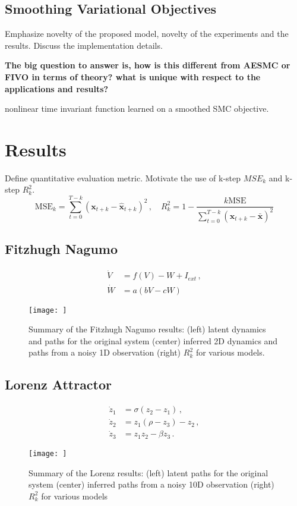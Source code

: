 \documentclass{article}
\newcommand{\be}{\begin{equation}}
\newcommand{\ee}{\end{equation}}
\newcommand{\trm}[1]{\textrm{#1}}
\newcommand{\mbf}[1]{\mathbf{#1}}
\newcommand{\bx}{\mbf{x}}
\newcommand{\nn}{\nonumber}
\begin{document}
\subsection{Smoothing Variational Objectives}
Emphasize novelty of the proposed model, novelty of the experiments and the results. Discuss the implementation details. 

\textbf{The big question to answer is, how is this different from AESMC or FIVO in terms of theory? what is unique with respect to the applications and results?} 

nonlinear time invariant function learned on a smoothed SMC objective.


\section{Results}
Define quantitative evaluation metric. Motivate the use of k-step $MSE_k$ and k-step $R^2_k$.
\be
\trm{MSE}_k =  \sum_{t=0}^{T-k} \left( \bx_{t+k} - \hat{\bx}_{t+k} \right)^2 \,,\quad R^2_k = 1 - \frac{k\trm{MSE}}{\sum_{t=0}^{T-k} \left( \bx_{t+k} - \bar{\bx} \right)^2}
\ee

\subsection{Fitzhugh Nagumo}

\begin{align}
\dot V &= f(V) - W + I_{ext} \,, \nn\\
\dot W &= a(bV - cW)
\end{align}

\begin{figure*}
\texttt{[image: ]}
\caption{Summary of the Fitzhugh Nagumo results: (left) latent dynamics and paths for the original system (center) inferred 2D dynamics and paths from a noisy 1D observation (right) $R^2_k$ for various models.}
\end{figure*}


\subsection{Lorenz Attractor}
\begin{align}
  \dot{z}_1 & = \sigma(z_2-z_1) \,, \nn \\
  \dot{z}_2 & = z_1(\rho - z_3) - z_2 \,, \\
  \dot{z}_3 & = z_1z_2 - \beta z_3\,. \nn
\end{align}
\begin{figure*}
\texttt{[image: ]}
\caption{Summary of the Lorenz results: (left) latent paths for the original system (center) inferred paths from a noisy 10D observation (right) $R^2_k$ for various models}
\end{figure*}
\end{document}
